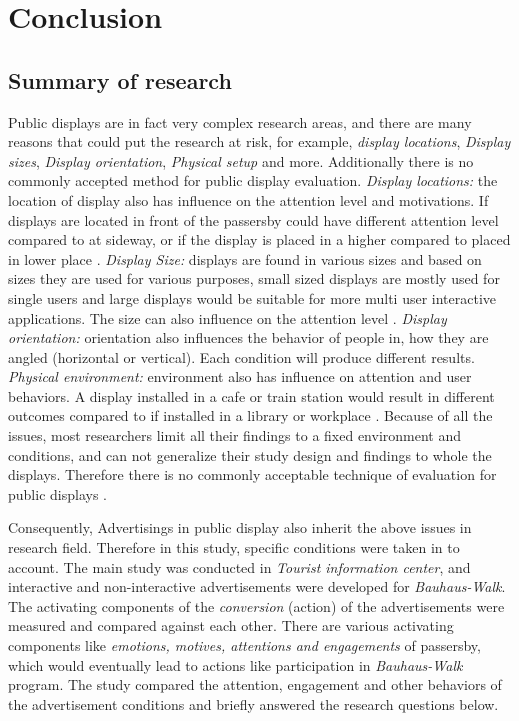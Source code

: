 \chapter{Conclusion} %

\label{Chapter10} %
\newpage

\section{Summary of research}

Public displays are in fact very complex research areas, and there are many reasons that could put the research at risk, for example, \emph{display locations}, \emph{Display sizes}, \emph{ Display orientation}, \emph{Physical setup} and more. Additionally there is no commonly accepted method for public display evaluation. \emph{Display locations:} the location of display also has influence on the attention level and motivations. If displays are located in front of the passersby could have different attention level compared to at sideway, or if the display is placed in a higher compared to placed in lower place \cite{WhenPublicDisplays}. \emph{Display Size:} displays are found in various sizes and based on sizes they are used for various purposes, small sized displays are mostly used for single users and large displays would be suitable for more multi user interactive applications. The size can also influence on the attention level \cite{WhenPublicDisplays}. \emph{Display orientation:} orientation also influences the behavior of people in, how they are angled (horizontal or vertical). Each condition will produce different results\cite{DisplayAngleEffect}. \emph{Physical environment:} environment also has influence on attention and user behaviors. A display installed in a cafe or train station\cite{multimediaworkplace} would result in different outcomes compared to if installed in a library or workplace \cite{multimediaworkplace, semidisplay }. Because of all the issues, most researchers limit all their findings to a fixed environment and conditions, and can not generalize their study design and findings to whole the displays.  Therefore there is no commonly acceptable technique of evaluation for public displays \cite{HowToEvaluate}.

Consequently, Advertisings in public display also inherit the above issues in research field. Therefore in this study, specific conditions were taken in to account. The main study was conducted in \emph{Tourist information center}, and interactive and non-interactive advertisements were developed for \emph{Bauhaus-Walk}. The activating components of the \emph{conversion} (action) of the advertisements were measured and compared against each other. There are various activating components like \emph{emotions, motives, attentions and engagements} of passersby, which would eventually lead to actions like participation in \emph{Bauhaus-Walk} program. The study compared the attention, engagement and other behaviors of the advertisement conditions and briefly answered the research questions below.





